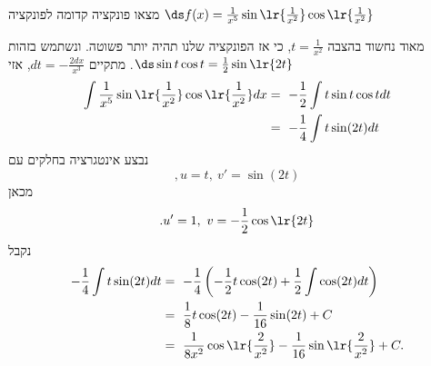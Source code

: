 מצאו פונקציה קדומה לפונקציה
$\ds f(x)=\frac{1}{x^{5}}\sin\lr{\frac{1}{x^{2}}}\cos\lr{\frac{1}{x^{2}}}$
\begin{solbox}
מאוד נחשוד בהצבה  $t=\frac{1}{x^2}$,
כי אז הפונקציה שלנו תהיה יותר פשוטה.
ונשתמש בזהות $\ds \sin t\cos t=\frac12\sin\lr{2t}$.
מתקיים
$dt=-\frac{2dx}{x^3}$,
אזי
\begin{align*}
    \int\frac{1}{x^{5}}\sin\lr{\frac{1}{x^{2}}}\cos\lr{\frac{1}{x^{2}}}dx&=\ -\frac{1}{2}\int t\sin t\cos tdt\\
    &=\ -\frac{1}{4}\int t\sin(2t)dt\\
\end{align*}
נבצע אינטגרציה בחלקים עם
$$,u=t,\ v'=\sin(2t)$$
מכאן
$$.u'=1,\ v=-\frac{1}{2}\cos\lr{2t}$$
נקבל
\begin{align*}
    -\frac{1}{4}\int t\sin(2t)dt&=\ -\frac{1}{4}\left(-\frac{1}{2}t\cos(2t)+\frac{1}{2}\int\cos(2t)dt\right)\\
    &=\ \frac{1}{8}t\cos(2t)-\frac{1}{16}\sin(2t)+C\\
    &=\ \frac{1}{8x^2}\cos\lr{\frac{2}{x^2}}-\frac{1}{16}\sin\lr{\frac{2}{x^2}}+C.
\end{align*}
\end{solbox}
